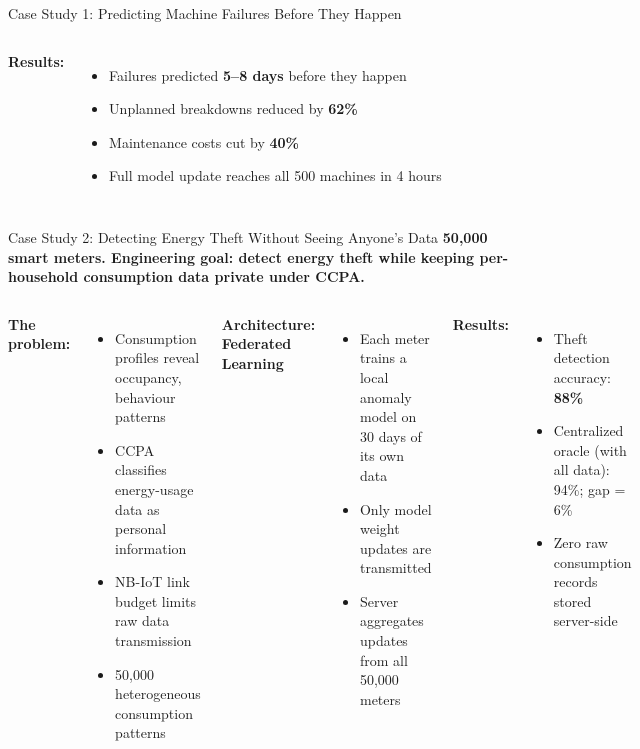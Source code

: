 \documentclass[aspectratio=169,11pt]{beamer}
\begin{document}
\begin{frame}{Case Study 1: Predicting Machine Failures Before They Happen}
\begin{columns}
        \textbf{Results:}
        \begin{itemize}\setlength{\itemsep}{0pt}
            \item Failures predicted \textbf{5--8 days} before they happen
            \item Unplanned breakdowns reduced by \textbf{62\%}
            \item Maintenance costs cut by \textbf{40\%}
            \item Full model update reaches all 500 machines in 4 hours
        \end{itemize}
    \end{columns}
\end{frame}

\begin{frame}[shrink]{Case Study 2: Detecting Energy Theft Without Seeing Anyone's Data}
    \small
    \textbf{50,000 smart meters. Engineering goal: detect energy theft while keeping per-household consumption data private under CCPA.}

    \vspace{0.1cm}
    \begin{columns}
        \textbf{The problem:}
        \begin{itemize}\setlength{\itemsep}{0pt}
            \item Consumption profiles reveal occupancy, behaviour patterns
            \item CCPA classifies energy-usage data as personal information
            \item NB-IoT link budget limits raw data transmission
            \item 50,000 heterogeneous consumption patterns
        \end{itemize}

        \vspace{0.1cm}
        \textbf{Architecture: Federated Learning}
        \begin{itemize}\setlength{\itemsep}{0pt}
            \item Each meter trains a local anomaly model on 30 days of its own data
            \item Only model weight updates are transmitted
            \item Server aggregates updates from all 50,000 meters
        \end{itemize}

        \textbf{Results:}
        \begin{itemize}\setlength{\itemsep}{0pt}
            \item Theft detection accuracy: \textbf{88\%}
            \item Centralized oracle (with all data): 94\%; gap = 6\%
            \item Zero raw consumption records stored server-side
        \end{itemize}


\end{columns}
\end{frame}
\end{document}

